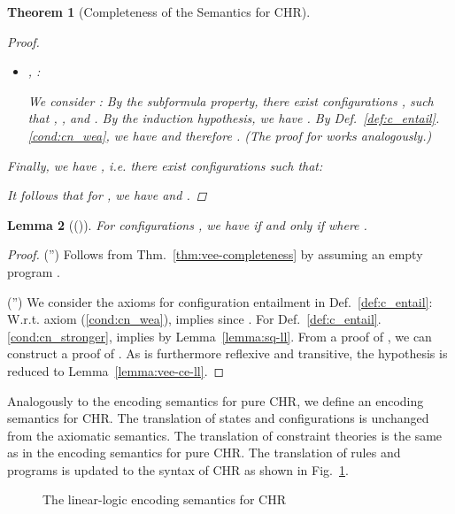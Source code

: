 \documentclass[acmtocl]{acmtrans2m}
\newtheorem{theorem}{Theorem}[section]
\newtheorem{lemma}[theorem]{Lemma}
\begin{document}
\begin{theorem}[Completeness of the Semantics for CHR]
\begin{proof}
\begin{itemize}
		Let  be goals, let
 be a state
		and let  be a configuration such that
,
		,  and
		. Let furthermore  and . Hence,
		,
		, and
		.
		The induction hypothesis gives us
		 and
		.
		By Def.~\ref{def:vee-config-equiv}.\ref{cond:vce_split} we have that
		.
		Finally by Lemma~\ref{lemma:vee-exchange}, we get .

	  \item ,  :
	  	
		We consider : By the subformula property, there exist
		configurations , such that
		, , and
		. By the induction hypothesis, we have
		. By
		Def.~\ref{def:c_entail}.\ref{cond:cn_wea}, we have
		 and therefore
		. (The proof for 
		works analogously.)
	\end{itemize}

	Finally, we have , i.e. there exist configurations  such that:
	
	It follows that for , we have  and .
\end{proof}
\end{theorem}

\begin{lemma}[()]
\label{lemma:vee-cn-ll}
For configurations , we have  \emph{if and only if}  where .
\end{lemma}

\begin{proof}
\noindent ('') Follows from Thm.~\ref{thm:vee-completeness} by
assuming an empty program .

\noindent ('')
We consider the axioms for configuration entailment in
Def.~\ref{def:c_entail}: W.r.t. axiom (\ref{cond:cn_wea}),
 implies  since
. For
Def.~\ref{def:c_entail}.\ref{cond:cn_stronger}, 
implies  by Lemma~\ref{lemma:sq-ll}. From a proof of
, we can construct a proof of . As  is
furthermore reflexive and transitive, the hypothesis is reduced to
Lemma~\ref{lemma:vee-ce-ll}.
\end{proof}

Analogously to the encoding semantics for pure CHR, we define an encoding
semantics for CHR. The translation of states and configurations is
unchanged from the axiomatic semantics. The translation of constraint
theories is the same as in the encoding semantics for pure CHR. The translation
of rules and programs is updated to the syntax of CHR as shown in
Fig.~\ref{fig:vee-encoding-semantics}.

\begin{figure}
\begin{center}
\caption{The linear-logic encoding semantics for CHR}
\end{center}
\label{fig:vee-encoding-semantics}
\end{figure}
\end{document}
